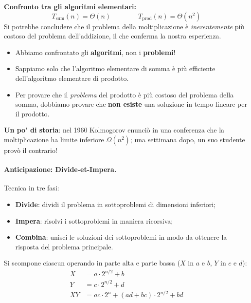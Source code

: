 \documentclass[12pt, a4paper]{article}
\begin{document}
\textbf{Confronto tra gli algoritmi elementari:}
$$T_{\text{sum}}(n) = \Theta(n) \qquad\qquad T_{\text{prod}}(n) = \Theta(n^2)$$
Si potrebbe concludere che il problema della moltiplicazione è \textit{inerentemente} più costoso del problema dell'addizione, il che conferma la nostra esperienza.

\begin{tcolorbox}[colback=lightergray!5, colframe=tocsubsec, title=\textbf{Attenzione!}]
\begin{itemize}
    \item Abbiamo confrontato gli \textbf{algoritmi}, non i \textbf{problemi}!
    \item Sappiamo solo che l'algoritmo elementare di somma è più efficiente dell'algoritmo elementare di prodotto.
    \item Per provare che il \emph{problema} del prodotto è più costoso del problema della somma, dobbiamo provare che \textbf{non esiste} una soluzione in tempo lineare per il prodotto.
\end{itemize}
\end{tcolorbox}

\textbf{Un po' di storia}: nel 1960 Kolmogorov enunciò in una conferenza che la moltiplicazione ha limite inferiore $\Omega(n^2)$; una settimana dopo, un suo studente provò il contrario!

\paragraph{Anticipazione: Divide-et-Impera.}
Tecnica in tre fasi:
\begin{itemize}
    \item \textbf{Divide}: dividi il problema in sottoproblemi di dimensioni inferiori;
    \item \textbf{Impera}: risolvi i sottoproblemi in maniera ricorsiva;
    \item \textbf{Combina}: unisci le soluzioni dei sottoproblemi in modo da ottenere la risposta del problema principale.
\end{itemize}

\begin{tcolorbox}[colback=lightergray!10, colframe=tocsec, title=\textbf{Moltiplicazione Divide-et-Impera}]
Si scompone ciascun operando in parte alta e parte bassa ($X$ in $a$ e $b$, $Y$ in $c$ e $d$):
\begin{align*}
X &= a\cdot 2^{n/2} + b \\
Y &= c\cdot 2^{n/2} + d \\
XY &= ac\cdot 2^{n} + (ad+bc)\cdot 2^{n/2} + bd
\end{align*}
\end{tcolorbox}
\end{document}
